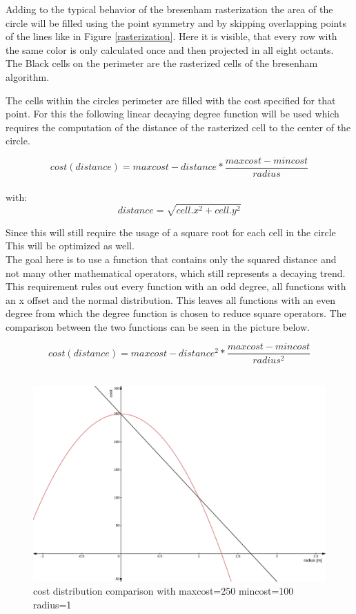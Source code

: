Adding to the typical behavior of the bresenham rasterization the area of the circle will be filled using the point symmetry and by skipping overlapping points of the lines like in Figure \ref{rasterization}. Here it is visible, that every row with the same color is only calculated once and then projected in all eight octants. The Black cells on the perimeter are the rasterized cells of the bresenham algorithm.

The cells within the circles perimeter are filled with the cost specified for that point. For this the following linear decaying  degree function will be used which requires the computation of the distance of the rasterized cell to the center of the circle.

\[cost(distance)=maxcost-distance*\frac{maxcost-mincost}{radius}\]\\
with: \[distance=\sqrt{cell.x^2+cell.y^2}\]

 Since this will still require the usage of a square root for each cell in the circle This will be optimized as well.\\

The goal here is to use a function that contains only the squared distance and not many other mathematical operators, which still represents a decaying trend. This requirement rules out every function with an odd degree, all functions with an x offset and the normal distribution. This leaves all functions with an even degree from which the  degree function is chosen to reduce square operators. The comparison between the two functions can be seen in the picture below.

\[cost(distance)=maxcost-distance^2*\frac{maxcost-mincost}{radius^2}\]\\

\begin{figure}[H]
	\begin{center}
	\includegraphics[width=140mm]{Pictures/linear cost comparison}
	\caption{cost distribution comparison with maxcost=250 mincost=100 radius=1}
	\end{center}
\end{figure}

